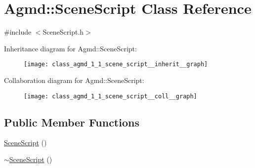 \hypertarget{class_agmd_1_1_scene_script}{\section{Agmd\+:\+:Scene\+Script Class Reference}
\label{class_agmd_1_1_scene_script}
}


{\ttfamily \#include $<$Scene\+Script.\+h$>$}



Inheritance diagram for Agmd\+:\+:Scene\+Script\+:\nopagebreak
\begin{figure}[H]
\begin{center}
\leavevmode
\texttt{[image: class\_agmd\_1\_1\_scene\_script\_\_inherit\_\_graph]}
\end{center}
\end{figure}


Collaboration diagram for Agmd\+:\+:Scene\+Script\+:\nopagebreak
\begin{figure}[H]
\begin{center}
\leavevmode
\texttt{[image: class\_agmd\_1\_1\_scene\_script\_\_coll\_\_graph]}
\end{center}
\end{figure}
\subsection*{Public Member Functions}
\begin{DoxyCompactItemize}
\item 
\hyperlink{class_agmd_1_1_scene_script_a4f93ffb2d1080060169e6d660c335429}{Scene\+Script} ()
\item 
\hyperlink{class_agmd_1_1_scene_script_a97d9976effe1ac8a339f38714c9f9099}{$\sim$\+Scene\+Script} ()
\end{DoxyCompactItemize}


